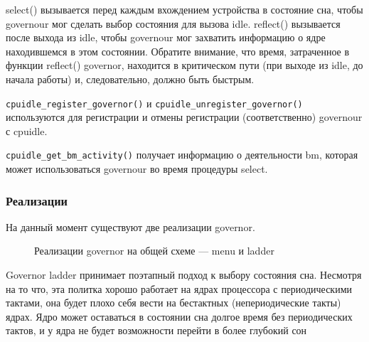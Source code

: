 \documentclass{article}
\begin{document}
select() вызывается перед каждым вхождением устройства в состояние сна, чтобы governour мог сделать выбор состояния для вызова idle. reflect() вызывается после выхода из idle, чтобы governour мог захватить информацию о ядре находившемся в этом состоянии. Обратите внимание, что время, затраченное в функции reflect() governor, находится в критическом пути (при выходе из idle, до начала работы) и, следовательно, должно быть быстрым.

\texttt{cpuidle\_register\_governor()}  и \texttt{cpuidle\_unregister\_governor()} используются для регистрации и отмены регистрации (соответственно) governour с cpuidle.

\texttt{cpuidle\_get\_bm\_activity()} получает информацию о деятельности bm, которая может использоваться governour во время процедуры select.

\subsubsection{Реализации}

На данный момент существуют две реализации governor.

\begin{figure}[h]
\caption{Реализации governor на общей схеме --- menu и ladder}
\end{figure}

Governor ladder принимает поэтапный подход к выбору состояния сна. Несмотря на то что, эта политка хорошо работает на ядрах процессора с периодическими тактами, она будет плохо себя вести на бестактных (непериодические такты) ядрах. Ядро может оставаться в состоянии сна долгое время без периодических тактов, и у ядра не будет возможности перейти в более глубокий сон
\end{document}
